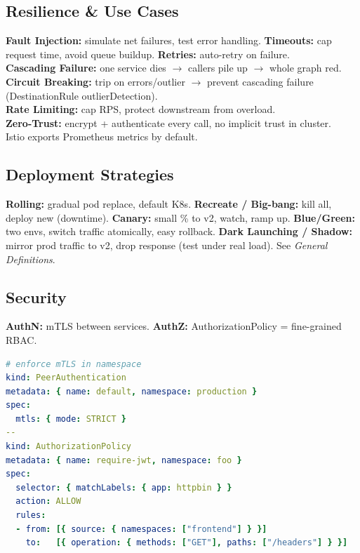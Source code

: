 \subsection{Resilience \& Use Cases}
\textbf{Fault Injection:} simulate net failures, test error handling. \textbf{Timeouts:} cap request time, avoid queue buildup. \textbf{Retries:} auto-retry on failure. \\
\textbf{Cascading Failure:} one service dies $\to$ callers pile up $\to$ whole graph red. \\
\textbf{Circuit Breaking:} trip on errors/outlier $\to$ prevent cascading failure (DestinationRule outlierDetection). \\
\textbf{Rate Limiting:} cap RPS, protect downstream from overload. \\
\textbf{Zero-Trust:} encrypt + authenticate every call, no implicit trust in cluster. \\
Istio exports Prometheus metrics by default.

\subsection{Deployment Strategies}
\textbf{Rolling:} gradual pod replace, default K8s. \textbf{Recreate / Big-bang:} kill all, deploy new (downtime). \textbf{Canary:} small \% to v2, watch, ramp up. \textbf{Blue/Green:} two envs, switch traffic atomically, easy rollback. \textbf{Dark Launching / Shadow:} mirror prod traffic to v2, drop response (test under real load). See \textit{General Definitions}.

\subsection{Security}
\textbf{AuthN:} mTLS between services. \textbf{AuthZ:} AuthorizationPolicy = fine-grained RBAC.
\begin{lstlisting}[language=yaml]
# enforce mTLS in namespace
kind: PeerAuthentication
metadata: { name: default, namespace: production }
spec:
  mtls: { mode: STRICT }
--
kind: AuthorizationPolicy
metadata: { name: require-jwt, namespace: foo }
spec:
  selector: { matchLabels: { app: httpbin } }
  action: ALLOW
  rules:
  - from: [{ source: { namespaces: ["frontend"] } }]
    to:   [{ operation: { methods: ["GET"], paths: ["/headers"] } }]
\end{lstlisting}
